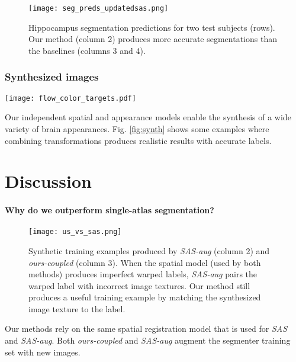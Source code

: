 \documentclass[10pt,twocolumn,letterpaper]{article}
\begin{document}
\begin{figure}
    \centering
    \texttt{[image: seg\_preds\_updatedsas.png]}
        \vspace{-5pt}
    \caption{Hippocampus segmentation predictions for two test subjects (rows). Our method (column 2) produces more accurate segmentations than the baselines (columns 3 and 4).}\label{fig:seg_preds}
\end{figure}

\subsubsection{Synthesized images}
\begin{figure*}[t]
    \centering
        \texttt{[image: flow\_color\_targets.pdf]}
    \caption{Since we model spatial and appearance transformations independently, we are able to synthesize a variety of combined effects. We show some examples synthesized using transformations learned from the training set; these transformations form the bases of our augmentation model. The top row shows a synthetic image where the appearance transformation produced a darkening effect, and the spatial transformation shrunk the ventricles and widened the whole brain. In the second row, the atlas is brightened and the ventricles are enlarged.}\label{fig:synth}
\end{figure*}



Our independent spatial and appearance models enable the synthesis of a wide variety of brain appearances. Fig. \ref{fig:synth} shows some examples where combining transformations produces realistic results with accurate labels. 




 \section{Discussion}\label{sec:discussion}
\vspace{-2pt}
\paragraph{Why do we outperform single-atlas segmentation?}
\begin{figure}[t]
\centering
\texttt{[image: us\_vs\_sas.png]}
\caption{Synthetic training examples produced by \textit{SAS-aug} (column 2) and \textit{ours-coupled} (column 3). When the spatial model (used by both methods) produces imperfect warped labels, \textit{SAS-aug} pairs the warped label with incorrect image textures. Our method still produces a useful training example by matching the synthesized image texture to the label.}
\label{fig:us_vs_sasaug}
\end{figure}
Our methods rely on the same spatial registration model that is used for \textit{SAS} and \textit{SAS-aug}. Both \textit{ours-coupled} and \textit{SAS-aug} augment the segmenter training set with  new images. 
\end{document}
